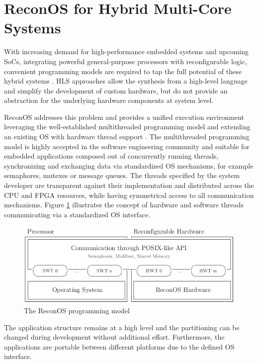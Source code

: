 \section{ReconOS for Hybrid Multi-Core Systems}
With increasing demand for high-performance embedded systems and upcoming
\acp{SoC}, integrating powerful general-purpose processors with reconfigurable
logic, convenient programming models are required to tap the full potential of
these hybrid systems \citep{ANA04,VMB13}. \ac{HLS} approaches allow the
synthesis from a high-level language and simplify the development of custom
hardware, but do not provide an abstraction for the underlying hardware
components at system level.

ReconOS addresses this problem and provides a unified execution environment
leveraging the well-established multithreaded programming model and extending
an existing \ac{OS} with hardware thread support \citep{AHK14}. The
multithreaded programming model is highly accepted in the software engineering
community and suitable for embedded applications \citep{ANA04} composed out of
concurrently running threads, synchronizing and exchanging data via
standardized \ac{OS} mechanisms, for example semaphores, mutexes or message
queues. The threads specified by the system developer are transparent against
their implementation and distributed across the \ac{CPU} and \ac{FPGA}
resources, while having symmetrical access to all communication mechanisms.
Figure \ref{fig:reconos_model} illustrates the concept of hardware and
software threads communicating via a standardized \ac{OS} interface.
\begin{figure}[tb]
	\centering
	\includegraphics{../figures/reconos_model}
	\caption{The ReconOS programming model}
	\label{fig:reconos_model}
\end{figure}
The application structure remains at a high level and the partitioning can be
changed during development without additional effort. Furthermore, the
applications are portable between different platforms due to the defined
\ac{OS} interface.

